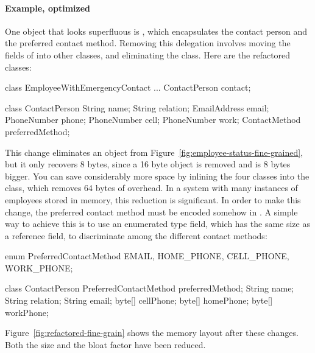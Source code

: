 \paragraph{Example, optimized} One object that looks superfluous is
, which encapsulates the contact person and the
preferred contact method. Removing this delegation involves moving the fields
of  into other classes, and eliminating the  class.
Here are the refactored classes:
\begin{shortlisting}
class EmployeeWithEmergencyContact {
    ...
    ContactPerson contact;
}
			
class ContactPerson {
    String name;
    String relation;
    EmailAddress email;
    PhoneNumber phone;
    PhoneNumber cell;
    PhoneNumber work;
    ContactMethod preferredMethod;
}
\end{shortlisting}
This change eliminates an object from
Figure~\ref{fig:employee-status-fine-grained}, but it only recovers 8 bytes,
since a 16 byte object is removed and  is 8 bytes bigger.
You can save considerably more space by inlining the four 
classes into the  class, which removes 64 bytes of
overhead. In a system with many instances of
employees stored in memory, this reduction is significant. In order to make this change,
the preferred contact method must be encoded somehow in .  A simple way to
achieve this is to use an enumerated type field, which has the same size as a
reference field, to discriminate among the different contact methods:
\begin{shortlisting} 
enum PreferredContactMethod {
    EMAIL, HOME_PHONE, CELL_PHONE, WORK_PHONE;
}
      
class ContactPerson {
    PreferredContactMethod preferredMethod;
    String name;
    String relation;
    String email;
    byte[] cellPhone;
    byte[] homePhone;
    byte[] workPhone;
}		
\end{shortlisting}
Figure~\ref{fig:refactored-fine-grain} shows the memory layout after these changes. Both the size
and the bloat factor have been reduced.
